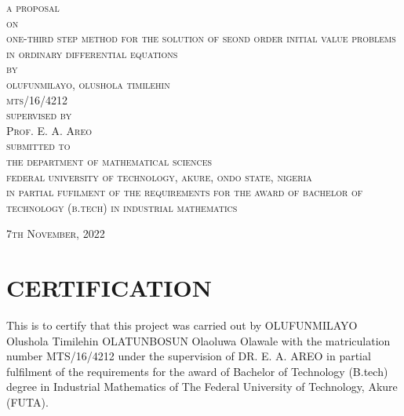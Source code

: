 \documentclass[12pt]{report}
\begin{document}
\begin{titlepage}
	\begin{center}
		\Large \textsc{a proposal}\\
		[5mm]
		\Large \textsc{on}\\
		[5mm]
		\Large \textsc{one-third step method for the solution of seond order initial value problems in ordinary differential equations}\\
		[5mm]
		\Large \textsc{by}\\
		[5mm]
		\Large \textsc{olufunmilayo, olushola timilehin \\ mts/16/4212}\\
		[5mm]
		\Large \textsc{supervised by}\\
		\Large \textsc{Prof. E. A. Areo}\\
		[5mm]
		\Large \textsc{submitted to}\\
		\Large \textsc{the department of mathematical sciences} \\ 
		\Large \textsc{federal university of technology, akure, ondo state, nigeria}\\
		[5mm]
		\Large \textsc{in partial fufilment of the requirements for the award of bachelor of technology (b.tech) in industrial mathematics}\\
		[12mm]
	\end{center}
	
	\begin{flushright}
		\large \textsc{7th November, 2022}
	\end{flushright}

\end{titlepage}

\newpage
{}


    \chapter*{CERTIFICATION}
%
\noindent This is to certify that this project was carried out by OLUFUNMILAYO Olushola Timilehin OLATUNBOSUN Olaoluwa Olawale with the matriculation number MTS/16/4212 under the supervision of DR. E. A. AREO in partial fulfilment of the requirements for the award of Bachelor of Technology (B.tech) degree in Industrial Mathematics of The Federal University of Technology, Akure (FUTA). \\
\\ \\
\end{document}

